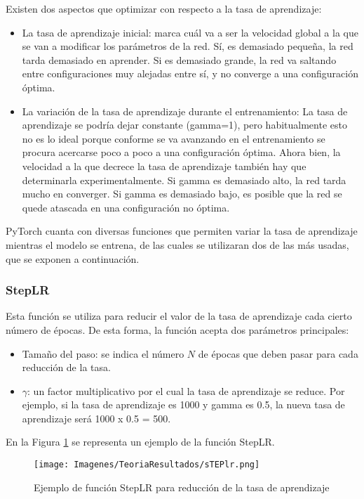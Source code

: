 \documentclass{report}
\begin{document}
Existen dos aspectos que optimizar con respecto a la tasa de aprendizaje: 
\begin{itemize}
    \item La tasa de aprendizaje inicial: marca cuál va a ser la velocidad global a la que se van a modificar los parámetros de la red. Sí, es demasiado pequeña, la red tarda demasiado en aprender. Si es demasiado grande, la red va saltando entre configuraciones muy alejadas entre sí, y no converge a una configuración óptima.
    \item La variación de la tasa de aprendizaje durante el entrenamiento: La tasa de aprendizaje se podría dejar constante (gamma=1), pero habitualmente esto no es lo ideal porque conforme se va avanzando en el entrenamiento se procura acercarse poco a poco a una configuración óptima. Ahora bien, la velocidad a la que decrece la tasa de aprendizaje también hay que determinarla experimentalmente. Si gamma es demasiado alto, la red tarda mucho en converger. Si gamma es demasiado bajo, es posible que la red se quede atascada en una configuración no óptima.
\end{itemize}


PyTorch cuanta con diversas funciones que permiten variar la tasa de aprendizaje mientras el modelo se entrena, de las cuales se utilizaran dos de las más usadas, que se exponen a continuación.


\subsubsection{StepLR}

Esta función se utiliza para reducir el valor de la tasa de aprendizaje cada cierto número de épocas. De esta forma, la función acepta dos parámetros principales:

\begin{itemize}
    \item Tamaño del paso: se indica el número $N$ de épocas que deben pasar para cada reducción de la tasa.
    \item $\gamma$: un factor multiplicativo por el cual la tasa de aprendizaje se reduce. Por ejemplo, si la tasa de aprendizaje es 1000 y gamma es 0.5, la nueva tasa de aprendizaje será 1000 x 0.5 = 500.
\end{itemize}


En la Figura \ref{fig:TasaAprendizajeStep} se representa un ejemplo de la función StepLR.

\begin{figure}[hbpt]
      \centering
	 \texttt{[image: Imagenes/TeoriaResultados/sTEPlr.png]}
	 \caption{ Ejemplo de función StepLR para reducción de la tasa de aprendizaje }
	 \label{fig:TasaAprendizajeStep}
\end{figure}
\end{document}

